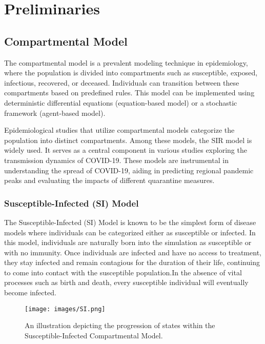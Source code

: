 \chapter{Preliminaries}
\label{chap:Preliminaries}

\section{ Compartmental Model}


\hspace{1 cm}The compartmental model is a prevalent modeling technique in epidemiology, where the population is divided into compartments such as susceptible, exposed, infectious, recovered, or deceased. \cite{incremental} Individuals can transition between these compartments based on predefined rules. This model can be implemented using deterministic differential equations (equation-based model) or a stochastic framework (agent-based model). \cite{kermack-1927}

\hspace{1 cm}Epidemiological studies that utilize compartmental models categorize the population into distinct compartments. Among these models, the SIR model is widely used. It serves as a central component in various studies exploring the transmission dynamics of COVID-19. These models are instrumental in understanding the spread of COVID-19, aiding in predicting regional pandemic peaks and evaluating the impacts of different quarantine measures. \cite{abouismail_2020_compartmental}

\subsection{Susceptible-Infected (SI) Model}
\indent \indent The Susceptible-Infected (SI) Model is known to be the simplest form of disease models where individuals can be categorized either as susceptible or infected. In this model, individuals are naturally born into the simulation as susceptible or with no immunity. \cite{incremental} Once individuals are infected and have no access to treatment, they stay infected and remain contagious for the duration of their life, continuing to come into contact with the susceptible population.In the absence of vital processes such as birth and death, every susceptible individual will eventually become infected. \cite{AHMETOLAN202219}

\begin{figure}[H]
	\centering
	{\texttt{[image: images/SI.png]}}
	
	\caption{An illustration depicting the progression of states within the Susceptible-Infected Compartmental Model. }%
	\label{1}%
\end{figure}


